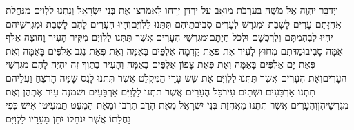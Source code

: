 \documentclass[../main/main.tex]{subfiles}
\begin{document}
\begin{multicols}{\ncols}
וַיְדַבֵּר יַהְוֶה אֶל מֹשֶׁה בְּעַרְבֹת מוֹאָב עַל יַרְדֵּן יְרֵחוֹ לֵאמֹר\PreVerseSpace{}צַו אֶת בְּנֵי יִשְׂרָאֵל וְנָתְנוּ לַלְוִיִּם מִנַּחֲלַת אֲחֻזָּתָם עָרִים לָשָׁבֶת וּמִגְרָשׁ לֶעָרִים סְבִיבֹתֵיהֶם תִּתְּנוּ לַלְוִיִּם\PreVerseSpace{}וְהָיוּ הֶעָרִים לָהֶם לָשָׁבֶת וּמִגְרְשֵׁיהֶם יִהְיוּ לִבְהֶמְתָּם וְלִרְכֻשָׁם וּלְכֹל חַיָּתָם\PreVerseSpace{}וּמִגְרְשֵׁי הֶעָרִים אֲשֶׁר תִּתְּנוּ לַלְוִיִּם מִקִּיר הָעִיר וָחוּצָה אֶלֶף אַמָּה סָבִיב\PreVerseSpace{}וּמַדֹּתֶם מִחוּץ לָעִיר אֶת פְּאַת קֵדְמָה אַלְפַּיִם בָּאַמָּה וְאֶת פְּאַת נֶגֶב אַלְפַּיִם בָּאַמָּה וְאֶת פְּאַת יָם אַלְפַּיִם בָּאַמָּה וְאֵת פְּאַת צָפוֹן אַלְפַּיִם בָּאַמָּה וְהָעִיר בַּתָּוֶךְ זֶה יִהְיֶה לָהֶם מִגְרְשֵׁי הֶעָרִים\PreVerseSpace{}וְאֵת הֶעָרִים אֲשֶׁר תִּתְּנוּ לַלְוִיִּם אֵת שֵׁשׁ עָרֵי הַמִּקְלָט אֲשֶׁר תִּתְּנוּ לָנֻס שָׁמָּה הָרֹצֵחַ וַעֲלֵיהֶם תִּתְּנוּ אַרְבָּעִים וּשְׁתַּיִם עִיר\PreVerseSpace{}כָּל הֶעָרִים אֲשֶׁר תִּתְּנוּ לַלְוִיִּם אַרְבָּעִים וּשְׁמֹנֶה עִיר אֶתְהֶן וְאֶת מִגְרְשֵׁיהֶן\PreVerseSpace{}וְהֶעָרִים אֲשֶׁר תִּתְּנוּ מֵאֲחֻזַּת בְּנֵי יִשְׂרָאֵל מֵאֵת הָרַב תַּרְבּוּ וּמֵאֵת הַמְעַט תַּמְעִיטוּ אִישׁ כְּפִי נַחֲלָתוֹ אֲשֶׁר יִנְחָלוּ יִתֵּן מֵעָרָיו לַלְוִיִּם\OpenSection{}\par

\end{multicols}
\end{document}
